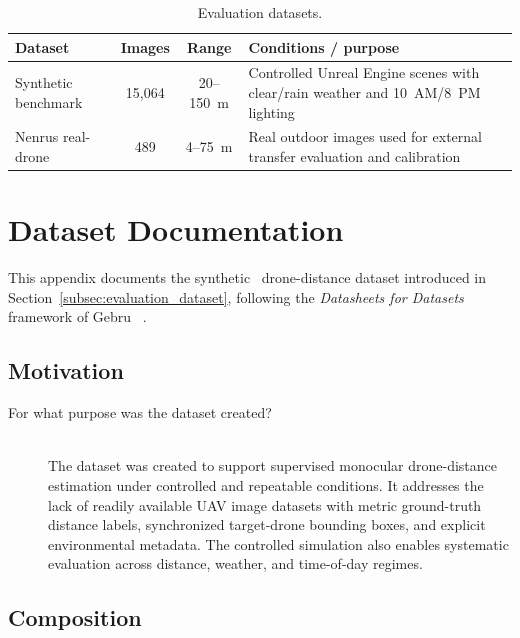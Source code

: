 \begin{table}[t]
\caption{Evaluation datasets.}
\label{tab:evaluation_datasets}
\centering
\small
\setlength{\tabcolsep}{4pt}
\renewcommand{\arraystretch}{1.15}
\begin{tabular}{lccp{2.9cm}}
\hline
\textbf{Dataset} &
\textbf{Images} &
\textbf{Range} &
\textbf{Conditions / purpose} \\
\hline
Synthetic benchmark &
15,064 &
20--150~m &
Controlled Unreal Engine scenes with clear/rain weather and 10~AM/8~PM lighting \\
Nenrus real-drone &
489 &
4--75~m &
Real outdoor images used for external transfer evaluation and calibration \\
\hline
\end{tabular}
\end{table}

\section{Dataset Documentation}
\label{sec:datasheet}

\noindent This appendix documents the synthetic \airdepth\ drone-distance
dataset introduced in Section~\ref{subsec:evaluation_dataset}, following the
\emph{Datasheets for Datasets} framework of Gebru \etal~\cite{gebru2021datasheets}.

\subsection{Motivation}

\begin{description}
    \item[For what purpose was the dataset created?] \hfill \\{}
    The dataset was created to support supervised monocular drone-distance
    estimation under controlled and repeatable conditions. It addresses the
    lack of readily available UAV image datasets with metric ground-truth
    distance labels, synchronized target-drone bounding boxes, and explicit
    environmental metadata. The controlled simulation also enables systematic
    evaluation across distance, weather, and time-of-day regimes.
\end{description}

\subsection{Composition}

